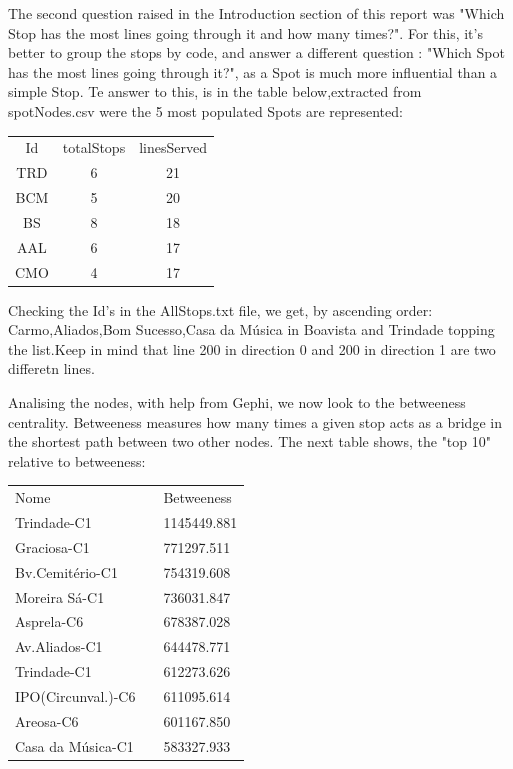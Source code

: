 \documentclass[12pt]{article}
\begin{document}
\begin{multicols}{2}
The second question raised in the Introduction section of this report was "Which Stop has the most lines going through it and how many times?". For this, it's better to group the stops by code, and answer a different question : "Which Spot has the most lines going through it?", as a Spot is much more influential than a simple Stop. Te answer to this, is in the table below,extracted from spotNodes.csv were the 5 most populated Spots are represented:
\begin{center}
\begin{tabular}[h]{ |c|c|c| }
\hline
    Id  & totalStops & linesServed\\
    TRD & 6          & 21 \\
    BCM & 5          & 20 \\
    BS  & 8          & 18 \\
    AAL & 6          & 17 \\
    CMO & 4          & 17 \\
\hline
\end{tabular}
\end{center}
Checking the Id's in the AllStops.txt file, we get, by ascending order:
Carmo,Aliados,Bom Sucesso,Casa da Música in Boavista and Trindade topping the list.Keep in mind that line 200 in direction 0 and 200 in direction 1 are two differetn lines.

Analising the nodes, with help from Gephi, we now look to the betweeness centrality. Betweeness measures how many times a given stop acts as a bridge in the shortest path between two other nodes. The next table shows, the "top 10" relative to betweeness:\\
\begin{tabular}[h]{|l|l|l|}
\hline
	Nome 				&& Betweeness\\
	Trindade-C1 		&& 1145449.881\\%
	Graciosa-C1 		&& 771297.511\\%
	Bv.Cemitério-C1 	&& 754319.608\\%
	Moreira Sá-C1 		&& 736031.847\\%
	Asprela-C6 			&& 678387.028\\%
	Av.Aliados-C1 		&& 644478.771\\%
	Trindade-C1			&& 612273.626\\%
	IPO(Circunval.)-C6 	&& 611095.614\\%
	Areosa-C6 			&& 601167.850\\%
	Casa da Música-C1 	&& 583327.933\\%
\hline
\end{tabular}



\end{multicols}
\end{document}
